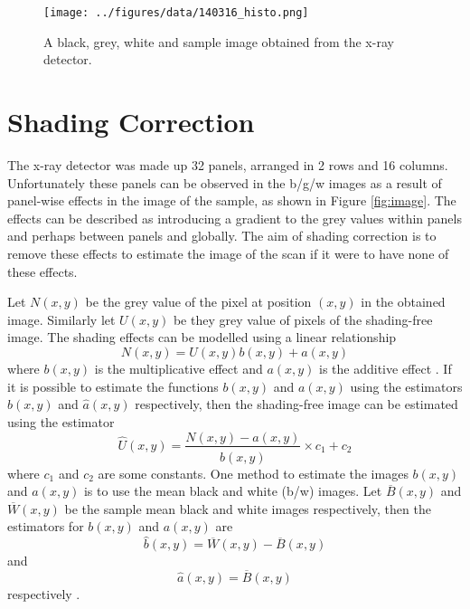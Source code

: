 \documentclass[a4paper]{proc}
\begin{document}
\begin{figure}
	\centering
	\texttt{[image: ../figures/data/140316\_histo.png]}
	\caption{A black, grey, white and sample image obtained from the x-ray detector.}
	\label{fig:hist}
\end{figure}

\section{Shading Correction}
The x-ray detector was made up 32 panels, arranged in 2 rows and 16 columns. Unfortunately these panels can be observed in the b/g/w images as a result of panel-wise effects in the image of the sample, as shown in Figure \ref{fig:image}. The effects can be described as introducing a gradient to the grey values within panels and perhaps between panels and globally. The aim of shading correction is to remove these effects to estimate the image of the scan if it were to have none of these effects.

Let $N(x,y)$ be the grey value of the pixel at position $(x,y)$ in the obtained image. Similarly let $U(x,y)$ be they grey value of pixels of the shading-free image. The shading effects can be modelled using a linear relationship
\begin{equation}
N(x,y) = U(x,y)b(x,y) + a(x,y)
\end{equation} 
where $b(x,y)$ is the multiplicative effect and $a(x,y)$ is the additive effect \cite{munzenmayer2003enhancing}. If it is possible to estimate the functions $b(x,y)$ and $a(x,y)$ using the estimators $\widehat{b}(x,y)$ and $\widehat{a}(x,y)$ respectively, then the shading-free image can be estimated using the estimator
\begin{equation}
\widehat{U}(x,y) = \frac{N(x,y)-\widehat{a}(x,y)}{\widehat{b}(x,y)} \times c_1 + c_2
\end{equation}
where $c_1$ and $c_2$ are some constants.
One method to estimate the images $b(x,y)$ and $a(x,y)$ is to use the mean black and white (b/w) images. Let $\overline{B}(x,y)$ and $\overline{W}(x,y)$ be the sample mean black and white images respectively, then the estimators for $b(x,y)$ and $a(x,y)$ are
\begin{equation}
\widehat{b}(x,y) = \overline{W}(x,y) - \overline{B}(x,y)
\end{equation}
and
\begin{equation}
\widehat{a}(x,y) = \overline{B}(x,y)
\end{equation}
respectively \cite{young2000shading}.
\end{document}
